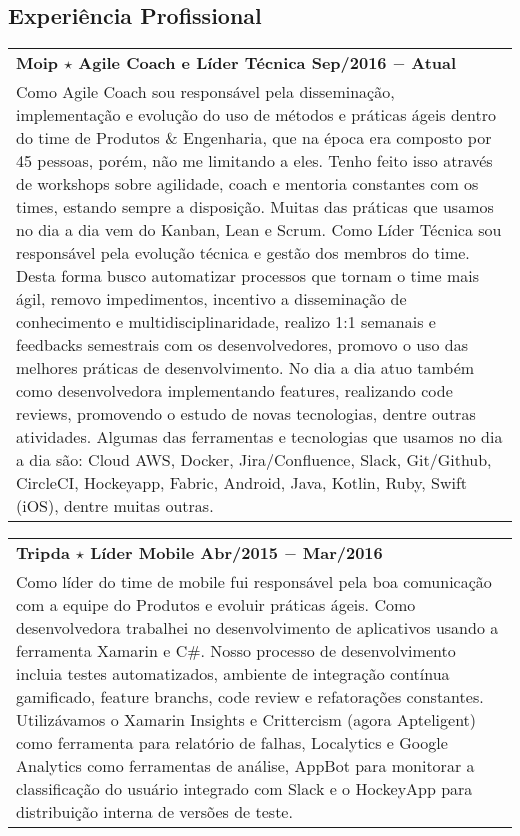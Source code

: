 \documentclass[a4paper, oneside, final]{scrartcl}
\newcommand{\vspc}{\vspace{0.15cm}} %
\begin{document}
\begin{center}
\section{Experiência Profissional}
\begin{tabularx}{1\linewidth}{X}
{\bf Moip $\star$ Agile Coach e Líder Técnica \hfill Sep/2016 $-$ Atual} \\
Como Agile Coach sou responsável pela disseminação, implementação e evolução do uso de métodos e práticas ágeis dentro do time de Produtos \& Engenharia, que na época era composto por 45 pessoas, porém, não me limitando a eles. Tenho feito isso através de workshops sobre agilidade, coach e mentoria constantes com os times, estando sempre a disposição. Muitas das práticas que usamos no dia a dia vem do Kanban, Lean e Scrum. Como Líder Técnica sou responsável pela evolução técnica e gestão dos membros do time. Desta forma busco automatizar processos que tornam o time mais ágil, removo impedimentos, incentivo a disseminação de conhecimento e multidisciplinaridade, realizo 1:1 semanais e feedbacks semestrais com os desenvolvedores, promovo o uso das melhores práticas de desenvolvimento. No dia a dia atuo também como desenvolvedora implementando features, realizando code reviews, promovendo o estudo de novas tecnologias, dentre outras atividades. Algumas das ferramentas e tecnologias que usamos no dia a dia são: Cloud AWS, Docker, Jira/Confluence, Slack, Git/Github, CircleCI, Hockeyapp, Fabric, Android, Java, Kotlin, Ruby, Swift (iOS), dentre muitas outras. \vspc\\
\end{tabularx}

\begin{tabularx}{1\linewidth}{X}
{\bf Tripda $\star$ Líder Mobile \hfill Abr/2015 $-$ Mar/2016} \\
Como líder do time de mobile fui responsável pela boa comunicação com a equipe do Produtos e evoluir práticas ágeis. Como desenvolvedora trabalhei no desenvolvimento de aplicativos usando a ferramenta Xamarin e C\#. Nosso processo de desenvolvimento incluia testes automatizados, ambiente de integração contínua gamificado, feature branchs, code review e refatorações constantes. Utilizávamos o Xamarin Insights e Crittercism (agora Apteligent) como ferramenta para relatório de falhas, Localytics e Google Analytics como ferramentas de análise, AppBot para monitorar a classificação do usuário integrado com Slack e o HockeyApp para distribuição interna de versões de teste. \vspc\\
\end{tabularx}


\end{center}
\end{document}
